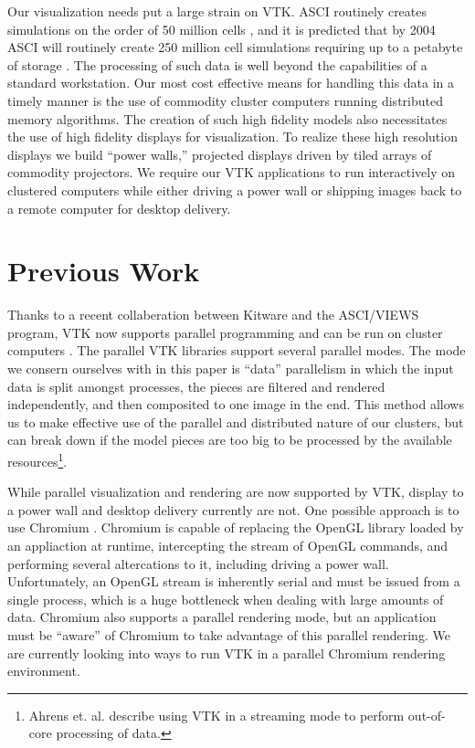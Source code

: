 \documentclass[twocolumn]{article}
\begin{document}
Our visualization needs put a large strain on VTK.  ASCI routinely creates
simulations on the order of 50 million cells \cite{Heermann99}, and it is
predicted that by 2004 ASCI will routinely create 250 million cell
simulations requiring up to a petabyte of storage \cite{Smith98}.  The
processing of such data is well beyond the capabilities of a standard
workstation.  Our most cost effective means for handling this data in a
timely manner is the use of commodity cluster computers running distributed
memory algorithms.  The creation of such high fidelity models also
necessitates the use of high fidelity displays for visualization.  To
realize these high resolution displays we build ``power walls,'' projected
displays driven by tiled arrays of commodity projectors.  We require our
VTK applications to run interactively on clustered computers while either
driving a power wall or shipping images back to a remote computer for
desktop delivery.


\section{Previous Work}
\label{sec:previous_work}

Thanks to a recent collaberation between Kitware and the ASCI/VIEWS
program, VTK now supports parallel programming and can be run on cluster
computers \cite{Ahrens00}.  The parallel VTK libraries support several
parallel modes.  The mode we consern ourselves with in this paper is
``data'' parallelism in which the input data is split amongst processes,
the pieces are filtered and rendered independently, and then composited to
one image in the end.  This method allows us to make effective use of the
parallel and distributed nature of our clusters, but can break down if the
model pieces are too big to be processed by the available
resources\footnote{Ahrens et. al. \cite{Ahrens01} describe using VTK in a
streaming mode to perform out-of-core processing of data.}.

While parallel visualization and rendering are now supported by VTK,
display to a power wall and desktop delivery currently are not.  One
possible approach is to use Chromium \cite{Humphreys02}.  Chromium is
capable of replacing the OpenGL library loaded by an appliaction at
runtime, intercepting the stream of OpenGL commands, and performing several
altercations to it, including driving a power wall.  Unfortunately, an
OpenGL stream is inherently serial and must be issued from a single
process, which is a huge bottleneck when dealing with large amounts of
data.  Chromium also supports a parallel rendering mode, but an application
must be ``aware'' of Chromium to take advantage of this parallel rendering.
We are currently looking into ways to run VTK in a parallel Chromium
rendering environment.
\end{document}
